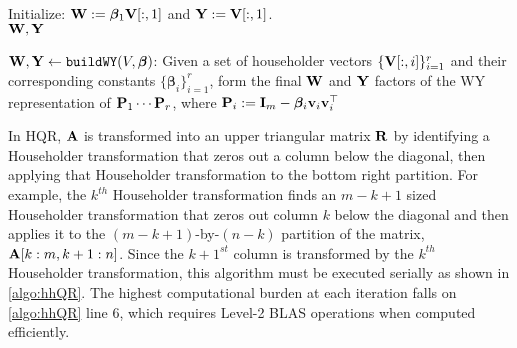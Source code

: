 \begin{algorithm2e}
	\DontPrintSemicolon %
	
	Initialize: $\mathbf{W}:=\bm{\beta}_1\mathbf{V}[:,1]$ and $\mathbf{Y}:=\mathbf{V}[:,1]$.\\
	\Return $\mathbf{W},\mathbf{Y}$
	\caption{$\mathbf{W},\mathbf{Y}\gets {\tt buildWY}(V, \bm{\beta})$: Given a set of householder vectors $\{\mathbf{V}[:,i]\}_{i=1}^r$ and their corresponding constants $\{\bm{\beta}_i\}_{i=1}^r$, form the final $\mathbf{W}$ and $\mathbf{Y}$ factors of the WY representation of $\mathbf{P}_1\cdots \mathbf{P}_r$, where $\mathbf{P}_i := \mathbf{I}_m - \bm{\beta}_i\mathbf{v}_i\mathbf{v}_i^{\top}$}
	\label{algo:buildWY}
\end{algorithm2e}

In HQR, $\mathbf{A}$ is transformed into an upper triangular matrix $\mathbf{R}$ by identifying a Householder transformation that zeros out a column below the diagonal, then applying that Householder transformation to the bottom right partition. 
For example, the $k^{th}$ Householder transformation finds an $m-k+1$ sized Householder transformation that zeros out column $k$ below the diagonal and then applies it to the $(m-k+1)$-by-$(n-k)$ partition of the matrix, $\mathbf{A}[k:m,k+1:n]$.
Since the $k+1^{st}$ column is transformed by the $k^{th}$ Householder transformation, this algorithm must be executed serially as shown in \cref{algo:hhQR}.
The highest computational burden at each iteration falls on \cref{algo:hhQR} line 6, which requires Level-2 BLAS operations when computed efficiently. \par

